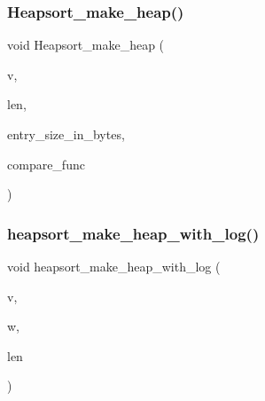 \mbox{\label{sorting_8_c_ae2f81d9c1e532bee5c80dfae7cc45bcc}} 
\subsubsection{\texorpdfstring{Heapsort\+\_\+make\+\_\+heap()}{Heapsort\_make\_heap()}}
{\footnotesize\ttfamily void Heapsort\+\_\+make\+\_\+heap (\begin{DoxyParamCaption}\item[{void $\ast$}]{v,  }\item[{\mbox{\hyperlink{galois_8h_a09fddde158a3a20bd2dcadb609de11dc}{I\+NT}}}]{len,  }\item[{\mbox{\hyperlink{galois_8h_a09fddde158a3a20bd2dcadb609de11dc}{I\+NT}}}]{entry\+\_\+size\+\_\+in\+\_\+bytes,  }\item[{\mbox{\hyperlink{galois_8h_a09fddde158a3a20bd2dcadb609de11dc}{I\+NT}}($\ast$)(void $\ast$v1, void $\ast$v2)}]{compare\+\_\+func }\end{DoxyParamCaption})}

\mbox{\label{sorting_8_c_a100d0747647500480fe5dc76ff98cee5}} 
\subsubsection{\texorpdfstring{heapsort\+\_\+make\+\_\+heap\+\_\+with\+\_\+log()}{heapsort\_make\_heap\_with\_log()}}
{\footnotesize\ttfamily void heapsort\+\_\+make\+\_\+heap\+\_\+with\+\_\+log (\begin{DoxyParamCaption}\item[{\mbox{\hyperlink{galois_8h_a09fddde158a3a20bd2dcadb609de11dc}{I\+NT}} $\ast$}]{v,  }\item[{\mbox{\hyperlink{galois_8h_a09fddde158a3a20bd2dcadb609de11dc}{I\+NT}} $\ast$}]{w,  }\item[{\mbox{\hyperlink{galois_8h_a09fddde158a3a20bd2dcadb609de11dc}{I\+NT}}}]{len }\end{DoxyParamCaption})}

